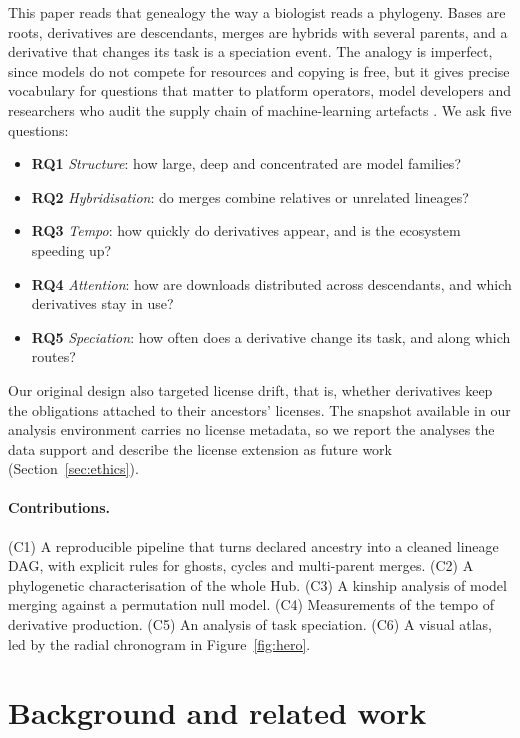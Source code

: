 \documentclass[11pt]{article}
\newcommand{\RQ}[1]{\textbf{RQ#1}}
\begin{document}
This paper reads that genealogy the way a biologist reads a phylogeny. Bases are roots, derivatives are descendants, merges are hybrids with several parents, and a derivative that changes its task is a speciation event. The analogy is imperfect, since models do not compete for resources and copying is free, but it gives precise vocabulary for questions that matter to platform operators, model developers and researchers who audit the supply chain of machine-learning artefacts \citep{jiang2023,stalnaker2026}. We ask five questions:

\begin{itemize}\setlength{\itemsep}{1pt}
\item \RQ1 \emph{Structure}: how large, deep and concentrated are model families?
\item \RQ2 \emph{Hybridisation}: do merges combine relatives or unrelated lineages?
\item \RQ3 \emph{Tempo}: how quickly do derivatives appear, and is the ecosystem speeding up?
\item \RQ4 \emph{Attention}: how are downloads distributed across descendants, and which derivatives stay in use?
\item \RQ5 \emph{Speciation}: how often does a derivative change its task, and along which routes?
\end{itemize}

Our original design also targeted license drift, that is, whether derivatives keep the obligations attached to their ancestors' licenses. The snapshot available in our analysis environment carries no license metadata, so we report the analyses the data support and describe the license extension as future work (Section~\ref{sec:ethics}).

\paragraph{Contributions.} (C1) A reproducible pipeline that turns declared ancestry into a cleaned lineage DAG, with explicit rules for ghosts, cycles and multi-parent merges. (C2) A phylogenetic characterisation of the whole Hub. (C3) A kinship analysis of model merging against a permutation null model. (C4) Measurements of the tempo of derivative production. (C5) An analysis of task speciation. (C6) A visual atlas, led by the radial chronogram in Figure~\ref{fig:hero}.

\section{Background and related work}
\end{document}
